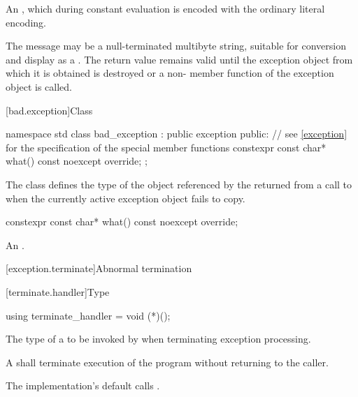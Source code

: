 \begin{itemdescr}
\pnum
\returns
An  \ntbs{},
which during constant evaluation is encoded with
the ordinary literal encoding.

\pnum
\remarks
The message may be a null-terminated multibyte string,
suitable for conversion and display as a
.
The return value remains valid until the exception object from which
it is obtained is destroyed or a non-
member function of the exception object is called.
\end{itemdescr}

[bad.exception]{Class }

%
%
\begin{codeblock}
namespace std {
  class bad_exception : public exception {
  public:
    // see \ref{exception} for the specification of the special member functions
    constexpr const char* what() const noexcept override;
  };
}
\end{codeblock}

\pnum
The class
defines the type of the object
referenced by the 
returned from a call to 
when the currently active exception object fails to copy.

%
\begin{itemdecl}
constexpr const char* what() const noexcept override;
\end{itemdecl}

\begin{itemdescr}
\pnum
\returns
An  \ntbs{}.
\end{itemdescr}

[exception.terminate]{Abnormal termination}

[terminate.handler]{Type }

%
\begin{itemdecl}
using terminate_handler = void (*)();
\end{itemdecl}

\begin{itemdescr}
\pnum
The type of a 
to be invoked by 
%
when terminating exception processing.

\pnum
\required
A  shall
terminate execution of the program without returning to the caller.

\pnum
{}
The implementation's default  calls
.%
%
\end{itemdescr}

